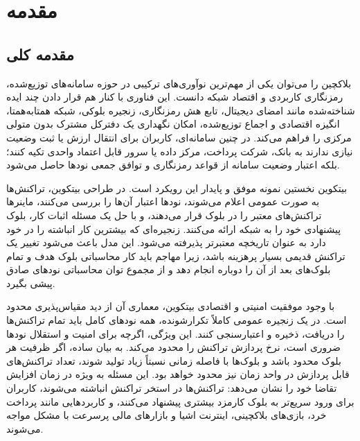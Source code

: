
\chapter{مقدمه}
\section{مقدمه کلی}

بلاکچین را می‌توان یکی از مهم‌ترین نوآوری‌های ترکیبی در حوزه سامانه‌های توزیع‌شده، رمزنگاری کاربردی و اقتصاد شبکه دانست. این فناوری با کنار هم قرار دادن چند ایده شناخته‌شده مانند امضای دیجیتال، تابع هش رمزنگاری، زنجیره بلوکی، شبکه همتا‌به‌همتا، انگیزه اقتصادی و اجماع توزیع‌شده، امکان نگهداری یک دفترکل مشترک بدون متولی مرکزی را فراهم می‌کند. در چنین سامانه‌ای، کاربران برای انتقال ارزش یا ثبت وضعیت نیازی ندارند به بانک، شرکت پرداخت، مرکز داده یا سرور قابل اعتماد واحدی تکیه کنند؛ بلکه اعتبار وضعیت سامانه از قواعد رمزنگاری و توافق جمعی نودها حاصل می‌شود.

بیتکوین نخستین نمونه موفق و پایدار این رویکرد است. در طراحی بیتکوین، تراکنش‌ها به صورت عمومی اعلام می‌شوند، نودها اعتبار آن‌ها را بررسی می‌کنند، ماینرها تراکنش‌های معتبر را در بلوک قرار می‌دهند، و با حل یک مسئله اثبات کار، بلوک پیشنهادی خود را به شبکه ارائه می‌کنند. زنجیره‌ای که بیشترین کار انباشته را در خود دارد به عنوان تاریخچه معتبرتر پذیرفته می‌شود. این مدل باعث می‌شود تغییر یک تراکنش قدیمی بسیار پرهزینه باشد، زیرا مهاجم باید کار محاسباتی بلوک هدف و تمام بلوک‌های بعد از آن را دوباره انجام دهد و از مجموع توان محاسباتی نودهای صادق پیشی بگیرد.

با وجود موفقیت امنیتی و اقتصادی بیتکوین، معماری آن از دید مقیاس‌پذیری محدود است. در یک زنجیره عمومی کاملاً تکرارشونده، همه نودهای کامل باید تمام تراکنش‌ها را دریافت، ذخیره و اعتبارسنجی کنند. این ویژگی، اگرچه برای امنیت و استقلال نودها ضروری است، نرخ پردازش تراکنش را محدود می‌کند. به بیان ساده، اگر ظرفیت هر بلوک محدود باشد و بلوک‌ها با فاصله زمانی نسبتاً زیاد تولید شوند، تعداد تراکنش‌های قابل پردازش در واحد زمان نیز محدود خواهد بود. این مسئله به ویژه در زمان افزایش تقاضا خود را نشان می‌دهد: تراکنش‌ها در استخر تراکنش انباشته می‌شوند، کاربران برای ورود سریع‌تر به بلوک کارمزد بیشتری پیشنهاد می‌کنند، و کاربردهایی مانند پرداخت خرد، بازی‌های بلاکچینی، اینترنت اشیا و بازارهای مالی پرسرعت با مشکل مواجه می‌شوند.

